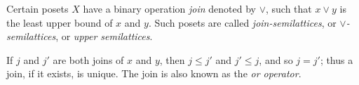 \documentclass[12pt]{article}
\begin{document}
Certain posets $X$ have a binary operation \emph{join} denoted by $\lor$, such that $x \lor y$ is the least upper bound of $x$ and $y$. Such posets are called \emph{join-semilattices}, or \emph{$\lor$-semilattices}, or \emph{upper semilattices}.

If $j$ and $j'$ are both joins of $x$ and $y$, then $j \leq j'$ and $j' \leq j$, and so $j = j'$; thus a join, if it exists, is unique.  The join is also known as the \emph{or operator}.
\end{document}
